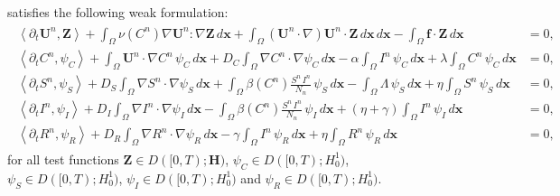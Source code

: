 \documentclass[10pt,number,preprint,times]{elsarticle}
\numberwithin{equation}{section} %
\begin{document}
	satisfies the following weak formulation:
	\begin{eqnarray}\label{eq:var-approched}
			\begin{split}
			\left\langle\partial_t\boldsymbol{U}^n, \boldsymbol{Z}\right\rangle+\int_{\Omega}	\nu(C^n) \nabla \boldsymbol{U}^n : \nabla \boldsymbol{Z}\, d\mathbf{x}+\int_{\Omega}	(\boldsymbol{U}^n\cdot\nabla)\boldsymbol{U}^n \cdot  \boldsymbol{Z}\, d\mathbf{x}\, d\mathbf{x}%
	-\int_{\Omega}\boldsymbol{f}\cdot \boldsymbol{Z}\, d\mathbf{x}&=0,
	\\  
		\left\langle\partial_tC^n, \psi_C \right\rangle+ \int_{\Omega}  \boldsymbol{U}^n\cdot\nabla C^n\, \psi_C\, d\mathbf{x}+ D_C\int_{\Omega}\nabla C^n \cdot\nabla \psi_C\, d\mathbf{x}%
		- \alpha\int_{\Omega} I^n\, \psi_C\, d\mathbf{x} + \lambda \int_{\Omega} C^n \,\psi_C \, d\mathbf{x}
	&=0,
	\\ 	  		
		\left\langle\partial_t S^n, \psi_S \right\rangle+ D_S\int_{\Omega}\nabla S^n \cdot\nabla \psi_S\, d\mathbf{x}+\int_{\Omega}\beta(C^n) \frac{S^n\,I^n}{N_n} \, \psi_S\, d\mathbf{x}%
		-\int_{\Omega} \Lambda \,\psi_S \, d\mathbf{x} + \eta \int_{\Omega} S^n \,\psi_S \, d\mathbf{x}
	&=0,
	\\ 	  		
		\left\langle\partial_t I^n, \psi_I \right\rangle+ D_I\int_{\Omega}\nabla I^n \cdot\nabla \psi_I\, d\mathbf{x}-\int_{\Omega}\beta(C^n) \frac{S^n\,I^n}{N_n} \, \psi_I\, d\mathbf{x} + (\eta+\gamma) \int_{\Omega} I^n \,\psi_I \, d\mathbf{x}
	&=0,
	\\ 	  		
		\left\langle\partial_t R^n, \psi_R \right\rangle+ D_R\int_{\Omega}\nabla R^n \cdot\nabla \psi_R\, d\mathbf{x}-\gamma\int_{\Omega} I^n \,\psi_R \, d\mathbf{x}+ \eta\int_{\Omega} R^n \,\psi_R \, d\mathbf{x}
	&=0,
\end{split} 
	\end{eqnarray}   
	for all test functions $\boldsymbol{Z} \in D([0,T); \mathbf{H})$, $\psi_C \in D([0,T);  H^1_0)$, $\psi_S \in D([0,T);  H^1_0)$, $\psi_I \in D([0,T);  H^1_0)$ 
	and $\psi_R \in D([0,T);  H^1_0)$.
	
\end{document}
